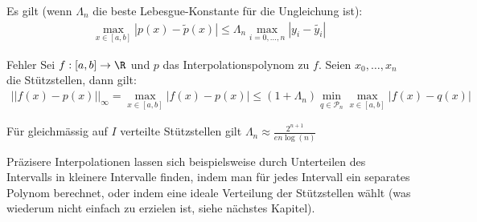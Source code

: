  Es gilt (wenn $\Lambda_n$ die beste Lebesgue-Konstante für die Ungleichung ist):
\rmvspace
\begin{align*}
	\max_{x \in [a, b]} |p(x) - \tilde{p}(x)| \leq \Lambda_n \max_{i = 0, \ldots, n} |y_i - \tilde{y_i}|
\end{align*}

\begin{theorem}[]{Fehler}
	Sei $f : [a, b] \rightarrow \R$ und $p$ das Interpolationspolynom zu $f$. Seien $x_0, \ldots, x_n$ die Stützstellen, dann gilt:
    \rmvspace
    \begin{align*}
        ||f(x) - p(x)||_{\infty} = \max_{x \in [a, b]}|f(x) - p(x)| \leq (1 + \Lambda_n) \min_{q \in \mathcal{P}_n} \max_{x \in [a, b]} |f(x) - q(x)|
    \end{align*}
\end{theorem}

\inlineremark Für gleichmässig auf $I$ verteilte Stützstellen gilt $\displaystyle \Lambda_n \approx \frac{2^{n + 1}}{e n \log(n)}$

 

Präzisere Interpolationen lassen sich beispielsweise durch Unterteilen des Intervalls in kleinere Intervalle finden, indem man für jedes Intervall ein separates Polynom berechnet, oder indem eine ideale Verteilung der Stützstellen wählt (was wiederum nicht einfach zu erzielen ist, siehe nächstes Kapitel).
